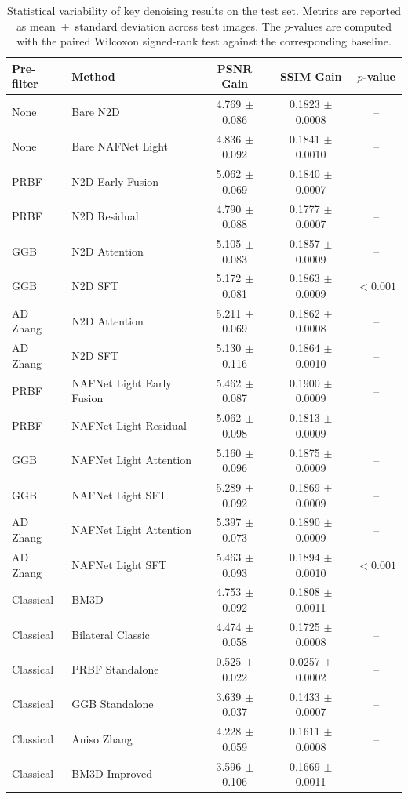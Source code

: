 \begin{table}[htbp]
    \centering
    \caption{Statistical variability of key denoising results on the test set. Metrics are reported as mean~$\pm$~standard deviation across test images. The $p$-values are computed with the paired Wilcoxon signed-rank test against the corresponding baseline.}
    \label{tab:statistical_variability}
    \small
    \renewcommand{\arraystretch}{1.15}
    \begin{tabular}{llccc}
        \toprule
        \textbf{Pre-filter} & \textbf{Method} & \textbf{PSNR Gain} & \textbf{SSIM Gain} & \textbf{$p$-value} \\
        \midrule
        None & Bare N2D & 4.769 $\pm$ 0.086 & 0.1823 $\pm$ 0.0008 & -- \\
        None & Bare NAFNet Light & 4.836 $\pm$ 0.092 & 0.1841 $\pm$ 0.0010 & -- \\
        PRBF & N2D Early Fusion & 5.062 $\pm$ 0.069 & 0.1840 $\pm$ 0.0007 & -- \\
        PRBF & N2D Residual & 4.790 $\pm$ 0.088 & 0.1777 $\pm$ 0.0007 & -- \\
        GGB & N2D Attention & 5.105 $\pm$ 0.083 & 0.1857 $\pm$ 0.0009 & -- \\
        GGB & N2D SFT & 5.172 $\pm$ 0.081 & 0.1863 $\pm$ 0.0009 & $<0.001$ \\
        AD Zhang & N2D Attention & 5.211 $\pm$ 0.069 & 0.1862 $\pm$ 0.0008 & -- \\
        AD Zhang & N2D SFT & 5.130 $\pm$ 0.116 & 0.1864 $\pm$ 0.0010 & -- \\
        PRBF & NAFNet Light Early Fusion & 5.462 $\pm$ 0.087 & 0.1900 $\pm$ 0.0009 & -- \\
        PRBF & NAFNet Light Residual & 5.062 $\pm$ 0.098 & 0.1813 $\pm$ 0.0009 & -- \\
        GGB & NAFNet Light Attention & 5.160 $\pm$ 0.096 & 0.1875 $\pm$ 0.0009 & -- \\
        GGB & NAFNet Light SFT & 5.289 $\pm$ 0.092 & 0.1869 $\pm$ 0.0009 & -- \\
        AD Zhang & NAFNet Light Attention & 5.397 $\pm$ 0.073 & 0.1890 $\pm$ 0.0009 & -- \\
        AD Zhang & NAFNet Light SFT & 5.463 $\pm$ 0.093 & 0.1894 $\pm$ 0.0010 & $<0.001$ \\
        Classical & BM3D & 4.753 $\pm$ 0.092 & 0.1808 $\pm$ 0.0011 & -- \\
        Classical & Bilateral Classic & 4.474 $\pm$ 0.058 & 0.1725 $\pm$ 0.0008 & -- \\
        Classical & PRBF Standalone & 0.525 $\pm$ 0.022 & 0.0257 $\pm$ 0.0002 & -- \\
        Classical & GGB Standalone & 3.639 $\pm$ 0.037 & 0.1433 $\pm$ 0.0007 & -- \\
        Classical & Aniso Zhang & 4.228 $\pm$ 0.059 & 0.1611 $\pm$ 0.0008 & -- \\
        Classical & BM3D Improved & 3.596 $\pm$ 0.106 & 0.1669 $\pm$ 0.0011 & -- \\
        \bottomrule
    \end{tabular}
\end{table}
